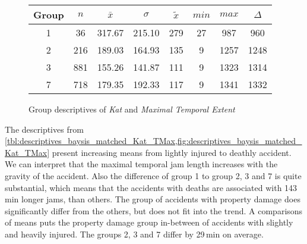 \begin{figure}[ht!]
	\centering
	\begin{minipage}{0.5\textwidth}
		\tiny
		\setlength{\tabcolsep}{4pt}
		\centering
		\begin{tabular}{c|c|c|c|c|c|c|c}
			\toprule
			Group & $n$ & $\bar{x}$ & $\sigma$ & $\tilde{x}$ & $min$ & $max$ & $\Delta$ \\
			\midrule
			1 & 36  & 317.67 & 215.10 & 279 & 27 & 987  & 960 \\ 
			2 & 216 & 189.03 & 164.93 & 135 & 9  & 1257 & 1248 \\ 
			3 & 881 & 155.26 & 141.87 & 111 & 9  & 1323 & 1314 \\ 
			7 & 718 & 179.35 & 192.33 & 117 & 9  & 1341 & 1332 \\ 
			\bottomrule
		\end{tabular}
		\label{tbl:descriptives_baysis_matched_Kat_TMax}
	\end{minipage}%
	\begin{minipage}{0.55\textwidth}
		\tiny
		\centering
		\vfill
		\label{fig:descriptives_baysis_matched_Kat_TMax}
	\end{minipage}%
	\caption{Group descriptives of  \textit{Kat} and \textit{Maximal Temporal Extent}}
\end{figure}
The descriptives from \cref{tbl:descriptives_baysis_matched_Kat_TMax,fig:descriptives_baysis_matched_Kat_TMax} present increasing means from lightly injured to deathly accident. We can interpret that the maximal temporal jam length  increases with the gravity of the accident. Also the difference of group 1 to group 2, 3 and 7 is quite substantial, which means that the accidents with deaths are associated with 143\,min longer jams, than others. The group of accidents with property damage does significantly differ from the others, but does not fit into the trend. A comparisons of means puts the property damage group in-between of accidents with slightly and heavily injured. The groups 2, 3 and 7 differ by 29\,min on average.

